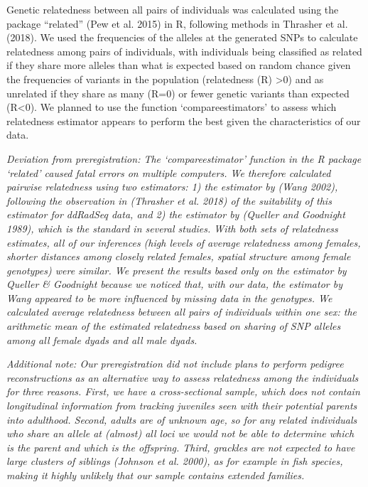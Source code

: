 \documentclass[]{article}
\begin{document}
Genetic relatedness between all pairs of individuals was calculated
using the package ``related'' (Pew et al. 2015) in R, following methods
in Thrasher et al. (2018). We used the frequencies of the alleles at the
generated SNPs to calculate relatedness among pairs of individuals, with
individuals being classified as related if they share more alleles than
what is expected based on random chance given the frequencies of
variants in the population (relatedness (R) \textgreater{}0) and as
unrelated if they share as many (R=0) or fewer genetic variants than
expected (R\textless{}0). We planned to use the function
`compareestimators' to assess which relatedness estimator appears to
perform the best given the characteristics of our data.

\emph{Deviation from preregistration: The `compareestimator' function in
the R package `related' caused fatal errors on multiple computers. We
therefore calculated pairwise relatedness using two estimators: 1) the
estimator by (Wang 2002), following the observation in (Thrasher et al.
2018) of the suitability of this estimator for ddRadSeq data, and 2) the
estimator by (Queller and Goodnight 1989), which is the standard in
several studies. With both sets of relatedness estimates, all of our
inferences (high levels of average relatedness among females, shorter
distances among closely related females, spatial structure among female
genotypes) were similar. We present the results based only on the
estimator by Queller \& Goodnight because we noticed that, with our
data, the estimator by Wang appeared to be more influenced by missing
data in the genotypes. We calculated average relatedness between all
pairs of individuals within one sex: the arithmetic mean of the
estimated relatedness based on sharing of SNP alleles among all female
dyads and all male dyads.}

\emph{Additional note: Our preregistration did not include plans to
perform pedigree reconstructions as an alternative way to assess
relatedness among the individuals for three reasons. First, we have a
cross-sectional sample, which does not contain longitudinal information
from tracking juveniles seen with their potential parents into
adulthood. Second, adults are of unknown age, so for any related
individuals who share an allele at (almost) all loci we would not be
able to determine which is the parent and which is the offspring. Third,
grackles are not expected to have large clusters of siblings (Johnson et
al. 2000), as for example in fish species, making it highly unlikely
that our sample contains extended families.}
\end{document}
